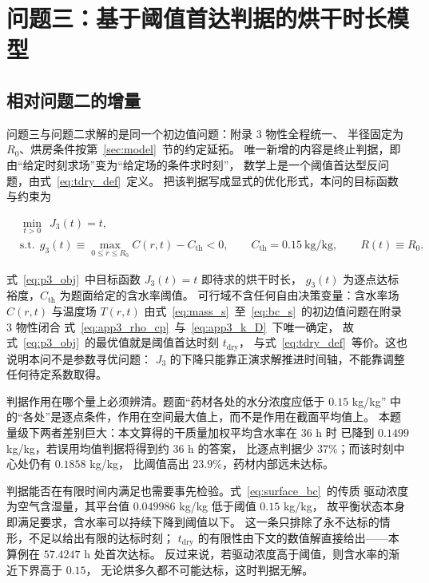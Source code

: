 \section{问题三：基于阈值首达判据的烘干时长模型}
\label{sec:p3}

\subsection{相对问题二的增量}

问题三与问题二求解的是同一个初边值问题：附录 3 物性全程统一、
半径固定为 $R_0$、烘房条件按第~\ref{sec:model}~节的约定延拓。
唯一新增的内容是终止判据，即由“给定时刻求场”变为“给定场的条件求时刻”，
数学上是一个阈值首达型反问题，由式~\eqref{eq:tdry_def}~定义。
把该判据写成显式的优化形式，本问的目标函数与约束为

\begin{equation}
\begin{aligned}
&\min_{t>0}\ \ J_3(t)=t,\\
&\mathrm{s.t.}\ \ g_3(t)\equiv\max_{0\le r\le R_0}C(r,t)-C_{\mathrm{th}}<0,
\qquad C_{\mathrm{th}}=0.15~\text{kg/kg},\qquad R(t)\equiv R_0 .
\end{aligned}
\label{eq:p3_obj}
\end{equation}

式~\eqref{eq:p3_obj}~中目标函数 $J_3(t)=t$ 即待求的烘干时长，
$g_3(t)$ 为逐点达标裕度，$C_{\mathrm{th}}$ 为题面给定的含水率阈值。
可行域不含任何自由决策变量：含水率场 $C(r,t)$ 与温度场 $T(r,t)$
由式~\eqref{eq:mass_s}~至~\eqref{eq:bc_s}~的初边值问题在附录 3 物性闭合
式~\eqref{eq:app3_rho_cp}~与~\eqref{eq:app3_k_D}~下唯一确定，
故式~\eqref{eq:p3_obj}~的最优值就是阈值首达时刻 $t_{\mathrm{dry}}$，
与式~\eqref{eq:tdry_def}~等价。这也说明本问不是参数寻优问题：
$J_3$ 的下降只能靠正演求解推进时间轴，不能靠调整任何待定系数取得。

判据作用在哪个量上必须辨清。题面“药材各处的水分浓度应低于 $0.15$ kg/kg”
中的“各处”是逐点条件，作用在空间最大值上，而不是作用在截面平均值上。
本题量级下两者差别巨大：本文算得的干质量加权平均含水率在 $36$ h 时
已降到 $0.1499$ kg/kg，若误用均值判据将得到约 $36$ h 的答案，
比逐点判据少 $37\%$；而该时刻中心处仍有 $0.1858$ kg/kg，
比阈值高出 $23.9\%$，药材内部远未达标。

判据能否在有限时间内满足也需要事先检验。式~\eqref{eq:surface_bc}~的传质
驱动浓度为空气含湿量，其平台值 $0.049986$ kg/kg 低于阈值 $0.15$ kg/kg，
故平衡状态本身即满足要求，含水率可以持续下降到阈值以下。
这一条只排除了永不达标的情形，不足以给出有限的达标时刻；
$t_{\mathrm{dry}}$ 的有限性由下文的数值解直接给出——本算例在 $57.4247$ h 处首次达标。
反过来说，若驱动浓度高于阈值，则含水率的渐近下界高于 $0.15$，
无论烘多久都不可能达标，这时判据无解。

